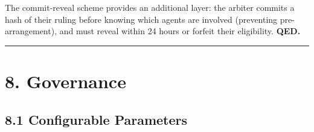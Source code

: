 \documentclass[
  10pt,
]{article}
\begin{document}
The commit-reveal scheme provides an additional layer: the arbiter
commits a hash of their ruling before knowing which agents are involved
(preventing pre-arrangement), and must reveal within 24 hours or forfeit
their eligibility. \textbf{QED.}

\begin{center}\rule{0.5\linewidth}{0.5pt}\end{center}

\hypertarget{governance}{%
\section{8. Governance}\label{governance}}

\hypertarget{configurable-parameters}{%
\subsection{8.1 Configurable Parameters}\label{configurable-parameters}}
\end{document}
